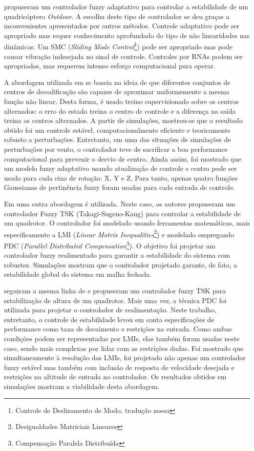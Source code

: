  propuseram um controlador fuzzy adaptativo para controlar a estabilidade de um quadricóptero \textit{Outdoor}. A escolha deste tipo de controlador se deu graças a inconvenientes apresentados por outros métodos. Controle adaptativo pode ser apropriado mas requer conhecimento aprofundado do tipo de não linearidades nas dinâmicas. Um SMC (\textit{Sliding Mode Control}\footnote{Controle de Deslizamento de Modo, tradução nossa}) pode ser apropriado mas pode causar vibração indesejada no sinal de controle. Controles por RNAs podem ser apropriados, mas requerem intenso esforço computacional para operar.

A abordagem utilizada em \cite{Coza2006} se baseia na ideia de que diferentes conjuntos de centros de decodificação são capazes de aproximar uniformemente a mesma função não linear. Desta forma, é usado treino supervisionado sobre os centros alternados: o erro do estado treina o centro de controle e a diferença na saída treina os centros alternados. A partir de simulações, mostrou-se que o resultado obtido foi um controle estável, computacionalmente eficiente e teoricamente robusto a perturbações. Entretanto, em uma das situações de simulações de perturbações por vento, o controlador teve de sacrificar a boa performance computacional para prevenir o desvio de centro. Ainda assim, foi mostrado que um modelo fuzzy adaptativo usando atualização de controle e centro pode ser usado para cada eixo de rotação: X, Y e Z. Para tanto, apenas quatro funções Gaussianas de pertinência fuzzy foram usadas para cada entrada de controle.

Em \cite{Rabhi2011} uma outra abordagem é utilizada. Neste caso, os autores propuseram um controlador Fuzzy TSK (Takagi-Sugeno-Kang) para controlar a estabilidade de um quadrotor. O controlador foi modelado usando ferramentas matemáticas, mais especificamente a LMI (\textit{Linear Matrix Inequalities}\footnote{Desigualdades Matriciais Lineares}) e modelado empregando PDC (\textit{Parallel Distributed Compensation}\footnote{Compensação Paralela Distribuída}). O objetivo foi projetar um controlador fuzzy realimentado para garantir a estabilidade do sistema com robustez. Simulações mostram que o controlador projetado garante, de fato, a estabilidade global do sistema em malha fechada.

 seguiram a mesma linha de  e propuseram um controlador fuzzy TSK para estabilização de altura de um quadrotor. Mais uma vez, a técnica PDC foi utilizada para projetar o controlador de realimentação. Neste trabalho, entretanto, o controle de estabilidade levou em conta especificações de performance como taxa de decaimento e restrições na entrada. Como ambas condições podem ser representadas por LMIs, elas também foram usadas neste caso, sendo mais complexas por lidar com as restrições dadas. Foi mostrado que simultaneamente à resolução das LMIs, foi projetado não apenas um controlador fuzzy estável mas também com inclusão de resposta de velocidade desejada e restrições na altitude de entrada no controlador. Os resultados obtidos em simulações mostram a viabilidade desta abordagem.

